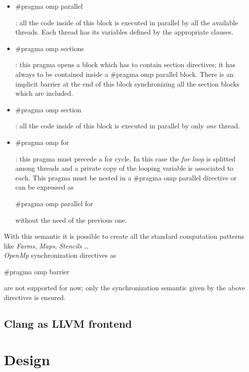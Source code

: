 \documentclass[a4paper,11pt,oneside]{book}
\begin{document}
\begin{itemize}
\item{\begin{bf}{$\#$pragma omp parallel}\end{bf} : all the code inside of this block is executed in parallel by all the available threads. Each thread has its variables defined by the appropriate clauses. }
\item{\begin{bf}{$\#$pragma omp sections}\end{bf} : this pragma opens a block which has to contain section directives; it has always to be contained inside a $\#$pragma omp parallel block. There is an implicit barrier at the end of this block synchronizing all the section blocks which are included. }
\item{\begin{bf}{$\#$pragma omp section}\end{bf} : all the code inside of this block is executed in parallel by only \emph{one} thread. }
\item{\begin{bf}{$\#$pragma omp for}\end{bf} : this pragma must precede a for cycle. In this case the \emph{for loop} is splitted among  threads and a private copy of the looping variable is associated to each. This pragma must be nested in a $\#$pragma omp parallel  directive or can be expressed as \begin{bf}{$\#$pragma omp parallel for}\end{bf} without the need of the previous one.  }
\end{itemize}
With this semantic it is possible to create all the standard computation patterns like \emph{Farms}, \emph{Maps}, \emph{Stencils} \dots \\
\emph{OpenMp} synchronization directives as \begin{bf}$\#$pragma omp barrier\end{bf} are not supported for now; only the synchronization semantic given by the above directives is ensured. 



\section{Clang as LLVM frontend}

\chapter{Design}
\end{document}

